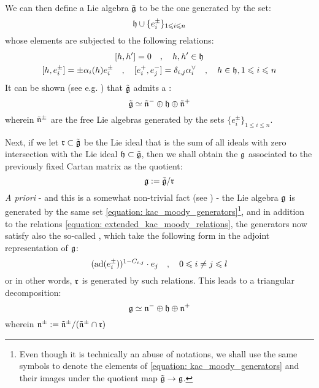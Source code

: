         We can then define a Lie algebra $\tilde{\mathfrak{g}}$ to be the one generated by the set:
            \begin{equation} \label{equation: kac_moody_generators}
                \mathfrak{h} \cup \{ e_i^{\pm} \}_{1 \leqslant i \leqslant n}
            \end{equation}
        whose elements are subjected to the following relations:
            \begin{equation} \label{equation: extended_kac_moody_relations}
                \begin{gathered}
                    [h, h'] = 0 \quad, \quad h, h' \in \h
                    \\
                    [h, e_i^{\pm}] = \pm \alpha_i(h) e_i^{\pm} \quad, \quad [e_i^+, e_j^-] = \delta_{i, j} \alpha_i^{\vee} \quad, \quad h \in \h, 1 \leq i \leq n
                \end{gathered}
            \end{equation}
        It can be shown (see e.g. \cite[Theorem 1.2]{kac_infinite_dimensional_lie_algebras}) that $\tilde{\mathfrak{g}}$ admits a :
            $$\tilde{\mathfrak{g}} \simeq \tilde{\mathfrak{n}}^- \oplus \mathfrak{h} \oplus \tilde{\mathfrak{n}}^+$$
        wherein $\tilde{\mathfrak{n}}^{\pm}$ are the free Lie algebras generated by the sets $\{ e_i^{\pm} \}_{1 \leq i \leq n}$.
            
        Next, if we let $\mathfrak{r} \subset \tilde{\mathfrak{g}}$ be the Lie ideal that is the sum of all ideals with zero intersection with the Lie ideal $\mathfrak{h} \subset \tilde{\mathfrak{g}}$, then we shall obtain the  $\mathfrak{g}$ associated to the previously fixed Cartan matrix as the quotient:
            $$\mathfrak{g} := \tilde{\mathfrak{g}}/\mathfrak{r}$$
        \textit{A priori} - and this is a somewhat non-trivial fact (see \cite[Theorem 9.11]{kac_infinite_dimensional_lie_algebras}) - the Lie algebra $\mathfrak{g}$ is generated by the same set \eqref{equation: kac_moody_generators}\footnote{Even though it is technically an abuse of notations, we shall use the same symbols to denote the elements of \eqref{equation: kac_moody_generators} and their images under the quotient map $\tilde{\mathfrak{g}} \to \mathfrak{g}$.}, and in addition to the relations \eqref{equation: extended_kac_moody_relations}, the generators now satisfy also the so-called , which take the following form in the adjoint representation of $\mathfrak{g}$:
            \begin{equation} \label{equation: kac_moody_serre_relations}
                ( \mathrm{ad}( e_i^{\pm} ) )^{1 - C_{i, j}} \cdot e_j \quad, \quad 0 \leqslant i \not = j \leqslant l
            \end{equation}
        or in other words, $\mathfrak{r}$ is generated by such relations. This leads to a triangular decomposition:
            $$\mathfrak{g} \simeq \mathfrak{n}^- \oplus \mathfrak{h} \oplus \mathfrak{n}^+$$
        wherein $\mathfrak{n}^{\pm} := \tilde{\mathfrak{n}}^{\pm}/( \tilde{\mathfrak{n}}^{\pm} \cap \mathfrak{r} )$

